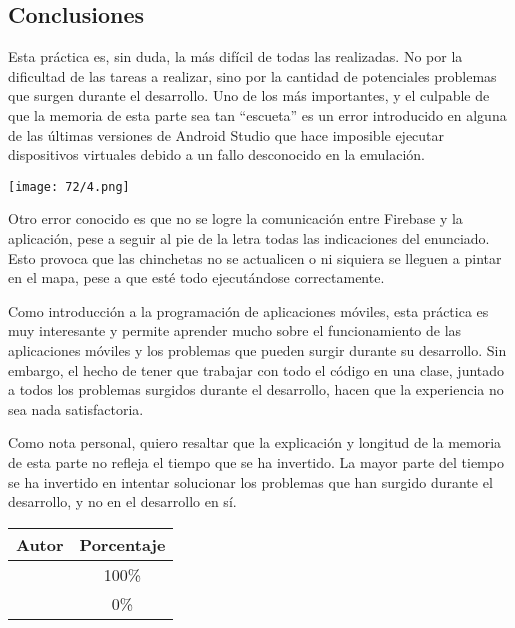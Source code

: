 \subsection{Conclusiones}
Esta práctica es, sin duda, la más difícil de todas las realizadas. No por la dificultad de las
tareas a realizar, sino por la cantidad de potenciales problemas que surgen durante el desarrollo.
Uno de los más importantes, y el culpable de que la memoria de esta parte sea tan ``escueta'' es
un error introducido en alguna de las últimas versiones de Android Studio que hace imposible
ejecutar dispositivos virtuales debido a un fallo desconocido en la emulación.

\begin{minipage}{\linewidth}
	\centering
	\texttt{[image: 72/4.png]}
	\label{fig:72/4}
\end{minipage}

Otro error conocido es que no se logre la comunicación entre Firebase y la aplicación, pese a seguir
al pie de la letra todas las indicaciones del enunciado. Esto provoca que las chinchetas no se
actualicen o ni siquiera se lleguen a pintar en el mapa, pese a que esté todo ejecutándose correctamente.

Como introducción a la programación de aplicaciones móviles, esta práctica es muy interesante y
permite aprender mucho sobre el funcionamiento de las aplicaciones móviles y los problemas que
pueden surgir durante su desarrollo. Sin embargo, el hecho de tener que trabajar con todo el código en una
clase, juntado a todos los problemas surgidos durante el desarrollo, hacen que la experiencia no sea
nada satisfactoria.

Como nota personal, quiero resaltar que la explicación y longitud de la memoria de esta parte no refleja
el tiempo que se ha invertido. La mayor parte del tiempo se ha invertido en intentar solucionar los
problemas que han surgido durante el desarrollo, y no en el desarrollo en sí.

\begin{center}
	\begin{tabular}{|c|c|}
		\hline
		\textbf{Autor} & \textbf{Porcentaje} \\
		\hline
		\hline
		\authorOne & 100\% \\
		\authorTwo & 0\% \\
		\hline
	\end{tabular}
\end{center}
